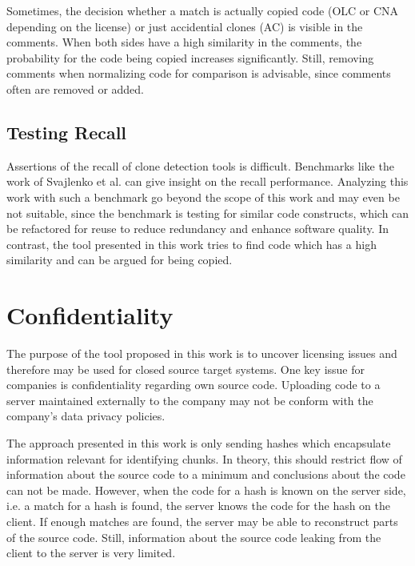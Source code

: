 Sometimes, the decision whether a match is actually copied code (OLC or CNA depending on the license) or just accidential clones (AC) is visible in the comments.
When both sides have a high similarity in the comments, the probability for the code being copied increases significantly.
Still, removing comments when normalizing code for comparison is advisable, since comments often are removed or added.


\subsection{Testing Recall}
Assertions of the recall of clone detection tools is difficult.
Benchmarks like the work of Svajlenko et al. \cite{svajlenko2014towards} can give insight on the recall performance.
Analyzing this work with such a benchmark go beyond the scope of this work and may even be not suitable, since the benchmark is testing for similar code constructs, which can be refactored for reuse to reduce redundancy and enhance software quality.
In contrast, the tool presented in this work tries to find code which has a high similarity and can be argued for being copied.

\section{Confidentiality}
The purpose of the tool proposed in this work is to uncover licensing issues and therefore may be used for closed source target systems.
One key issue for companies is confidentiality regarding own source code.
Uploading code to a server maintained externally to the company may not be conform with the company's data privacy policies.

The approach presented in this work is only sending hashes which encapsulate information relevant for identifying chunks.
In theory, this should restrict flow of information about the source code to a minimum and conclusions about the code can not be made.
However, when the code for a hash is known on the server side, i.e. a match for a hash is found, the server knows the code for the hash on the client.
If enough matches are found, the server may be able to reconstruct parts of the source code.
Still, information about the source code leaking from the client to the server is very limited.